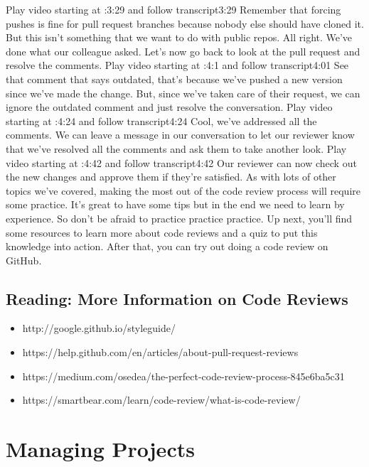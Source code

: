 	Play video starting at :3:29 and follow transcript3:29
	Remember that forcing pushes is fine for pull request branches because nobody else should have cloned it. But this isn't something that we want to do with public repos. All right. We've done what our colleague asked. Let's now go back to look at the pull request and resolve the comments.
	Play video starting at :4:1 and follow transcript4:01
	See that comment that says outdated, that's because we've pushed a new version since we've made the change. But, since we've taken care of their request, we can ignore the outdated comment and just resolve the conversation.
	Play video starting at :4:24 and follow transcript4:24
	Cool, we've addressed all the comments. We can leave a message in our conversation to let our reviewer know that we've resolved all the comments and ask them to take another look.
	Play video starting at :4:42 and follow transcript4:42
	Our reviewer can now check out the new changes and approve them if they're satisfied. As with lots of other topics we've covered, making the most out of the code review process will require some practice. It's great to have some tips but in the end we need to learn by experience. So don't be afraid to practice practice practice. Up next, you'll find some resources to learn more about code reviews and a quiz to put this knowledge into action. After that, you can try out doing a code review on GitHub.
	
	\subsection{Reading: More Information on Code Reviews}
	
	\begin{itemize}
		\item http://google.github.io/styleguide/
		
		\item https://help.github.com/en/articles/about-pull-request-reviews
		
		\item https://medium.com/osedea/the-perfect-code-review-process-845e6ba5c31
		
		\item https://smartbear.com/learn/code-review/what-is-code-review/
	\end{itemize}

\section{Managing Projects}
	

